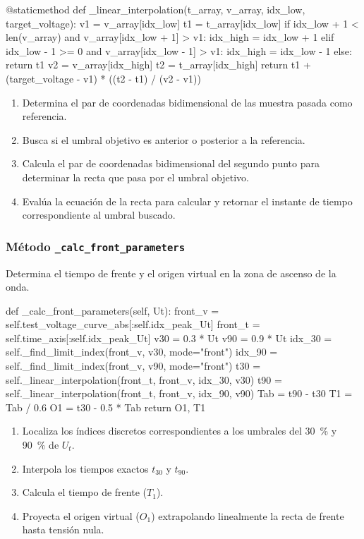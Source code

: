 \begin{python}
@staticmethod
def _linear_interpolation(t_array, v_array, idx_low, target_voltage):
    v1 = v_array[idx_low]
    t1 = t_array[idx_low]
    if idx_low + 1 < len(v_array) and v_array[idx_low + 1] > v1:
        idx_high = idx_low + 1
    elif idx_low - 1 >= 0 and v_array[idx_low - 1] > v1:
        idx_high = idx_low - 1
    else:
        return t1
    v2 = v_array[idx_high]
    t2 = t_array[idx_high]
    return t1 + (target_voltage - v1) * ((t2 - t1) / (v2 - v1))
\end{python}

\begin{enumerate}
    \item Determina el par de coordenadas bidimensional de las muestra pasada como referencia.
    \item Busca si el umbral objetivo es anterior o posterior a la referencia.
    \item Calcula el par de coordenadas bidimensional del segundo punto para determinar la recta que pasa por el umbral objetivo.
    \item Evalúa la ecuación de la recta para calcular y retornar el instante de tiempo correspondiente al umbral buscado.
\end{enumerate}

\subsubsection{Método \texttt{\_calc\_front\_parameters}}
Determina el tiempo de frente y el origen virtual en la zona de ascenso de la onda.

\begin{python}
def _calc_front_parameters(self, Ut):
    front_v = self.test_voltage_curve_abs[:self.idx_peak_Ut]
    front_t = self.time_axis[:self.idx_peak_Ut]
    v30 = 0.3 * Ut
    v90 = 0.9 * Ut
    idx_30 = self._find_limit_index(front_v, v30, mode="front")
    idx_90 = self._find_limit_index(front_v, v90, mode="front")
    t30 = self._linear_interpolation(front_t, front_v, idx_30, v30)
    t90 = self._linear_interpolation(front_t, front_v, idx_90, v90)
    Tab = t90 - t30
    T1 = Tab / 0.6
    O1 = t30 - 0.5 * Tab
    return O1, T1
\end{python}

\begin{enumerate}
    \item Localiza los índices discretos correspondientes a los umbrales del \SI{30}{\percent} y \SI{90}{\percent} de $U_t$.
    \item Interpola los tiempos exactos $t_{30}$ y $t_{90}$.
    \item Calcula el tiempo de frente ($T_1$).
    \item Proyecta el origen virtual ($O_1$) extrapolando linealmente la recta de frente hasta tensión nula.
\end{enumerate}

